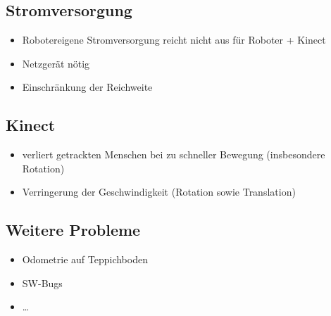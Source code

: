 \subsection{Stromversorgung}

\begin{itemize}
	\item Robotereigene Stromversorgung reicht nicht aus für Roboter + Kinect
	\item Netzgerät nötig
	\item Einschränkung der Reichweite
\end{itemize}

\subsection{Kinect}

\begin{itemize}
	\item verliert getrackten Menschen bei zu schneller Bewegung (insbesondere Rotation)
	\item Verringerung der Geschwindigkeit (Rotation sowie Translation)
\end{itemize}


\subsection{Weitere Probleme}

\begin{itemize}
	\item Odometrie auf Teppichboden
	\item SW-Bugs
	\item \ldots
\end{itemize}
